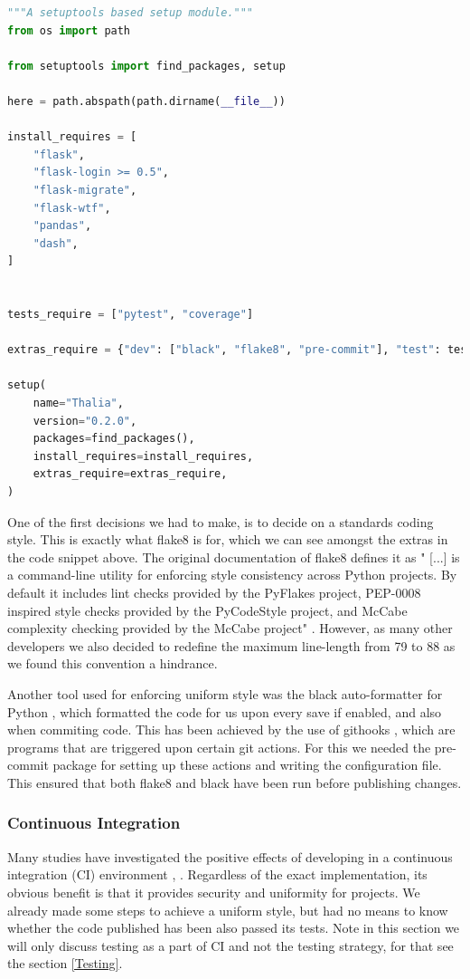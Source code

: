 \documentclass[main.tex]{subfiles}
\begin{document}
\begin{lstlisting}[language=Python, caption=setup.py - Development environment, label=lst:Development_env]
"""A setuptools based setup module."""
from os import path

from setuptools import find_packages, setup

here = path.abspath(path.dirname(__file__))

install_requires = [
    "flask",
    "flask-login >= 0.5",
    "flask-migrate",
    "flask-wtf",
    "pandas",
    "dash",
]


tests_require = ["pytest", "coverage"]

extras_require = {"dev": ["black", "flake8", "pre-commit"], "test": tests_require}

setup(
    name="Thalia",
    version="0.2.0",
    packages=find_packages(),
    install_requires=install_requires,
    extras_require=extras_require,
)
\end{lstlisting}

One of the first decisions we had to make, is to decide on a standards coding style. This is exactly what flake8 is for, which we can see amongst the extras in the code snippet above. The original documentation of flake8 defines it as " [...] is a command-line utility for enforcing style consistency across Python projects. By default it includes lint checks provided by the PyFlakes project, PEP-0008 inspired style checks provided by the PyCodeStyle project, and McCabe complexity checking provided by the McCabe project" \cite{flake8}. However, as many other developers we also decided to redefine the maximum line-length from 79 to 88 as we found this convention a hindrance. 

Another tool used for enforcing uniform style was the black auto-formatter for Python \cite{black}, which formatted the code for us upon every save if enabled, and also when commiting code. This has been achieved by the use of githooks \cite{githooks}, which are programs that are triggered upon certain git actions. For this we needed the pre-commit package for setting up these actions and writing the configuration file. This ensured that both flake8 and black have been run before publishing changes.

\subsubsection{Continuous Integration}
\label{Continuous Integration}

Many studies have investigated the positive effects of developing in a continuous integration (CI) environment \cite{CI_1}, \cite{CI_2}. Regardless of the exact implementation, its obvious benefit is that it provides security and uniformity for projects. We already made some steps to achieve a uniform style, but had no means to know whether the code published has been also passed its tests. Note in this section we will only discuss testing as a part of CI and not the testing strategy, for that see the section \ref{Testing}.
\end{document}

